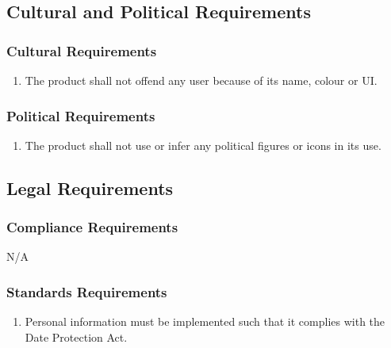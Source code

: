 \documentclass[]{article}
\begin{document}

\subsection{Cultural and Political Requirements}
\label{sub:cultural_and_political_requirements}

\subsubsection{Cultural Requirements}
\label{ssub:cultural_requirements}
\begin{enumerate}[{CP}1. ]
	\item The product shall not offend any user because of its name, colour or UI.
\end{enumerate}

\subsubsection{Political Requirements}
\label{ssub:political_requirements}
\begin{enumerate}[{CP}2. ]
	\item The product shall not use or infer any political figures or icons in its use.
\end{enumerate}


\subsection{Legal Requirements}
\label{sub:legal_requirements}

\subsubsection{Compliance Requirements}
\label{ssub:compliance_requirements}
N/A

\subsubsection{Standards Requirements}
\label{ssub:standards_requirements}
\begin{enumerate}[{LR}1. ]
	\item Personal information must be implemented such that it complies with the Date Protection Act.
\end{enumerate}
\end{document}
